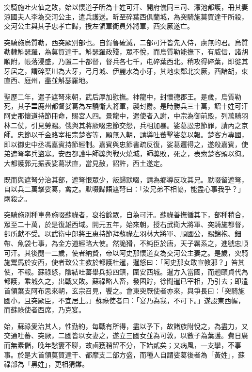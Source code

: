 \begin{pinyinscope}
 突騎施吐火仙之敗，始以懷道子昕為十姓可汗、開府儀同三司、濛池都護，冊其妻涼國夫人李為交河公主，遣兵護送。昕至碎葉西俱蘭城，為突騎施莫賀達干所殺，交河公主與其子忠孝亡歸，授左領軍衛員外將軍，西突厥遂亡。



 突騎施烏質勒，西突厥別部也。自賀魯破滅，二部可汗皆先入侍，虜無的君。烏質勒隸斛瑟羅，為莫賀達干。斛瑟羅政殘，眾不悅，而烏質勒能撫下，有威信，諸胡順附，帳落浸盛，乃置二十都督，督兵各七千，屯碎葉西北。稍攻得碎葉，即徙其牙居之，謂碎葉川為大牙，弓月城、伊麗水為小牙，其地東鄰北突厥，西諸胡，東直西、庭州，盡並斛瑟羅地。



 聖歷二年，遣子遮弩來朝，武后厚加慰撫。神龍中，封懷德郡王。是歲，烏質勒死，其子〓鹿州都督娑葛為左驍衛大將軍，襲封爵。是時勝兵三十萬，詔十姓可汗阿史那懷道持節冊命，賜宮人四。景龍中，遣使者入謝，中宗為御前殿，列萬騎羽林二仗，引見勞賜。俄與其將厥啜忠節交怨，兵相加暴。娑葛訟忠節罪，請內之京師。忠節以千金賂宰相宗楚客等，願無入朝，請導吐蕃擊娑葛以報。楚客方專國，即以御史中丞馮嘉賓持節經制。嘉賓與忠節書疏反復，娑葛邏得之，遂殺嘉賓，使弟遮弩率兵盜塞。安西都護牛師獎與戰火燒城，師獎敗，死之，表索楚客頭以徇。大都護郭元振表娑葛狀直，當見赦，詔許，西土遂定。



 既而與遮弩分治其部，遮弩恨眾少，叛歸默啜，請為鄉導反攻其兄。默啜留遮弩，自以兵二萬擊娑葛，禽之。默啜歸語遮弩曰：「汝兄弟不相協，能盡心事我乎？」兩殺之。



 突騎施別種車鼻施啜蘇祿者，裒拾餘眾，自為可汗。蘇祿善撫循其下，部種稍合，眾至二十萬，於是復雄西域。開元五年，始來朝，授右武衛大將軍、突騎施都督，卻所獻不受。以武衛中郎將王惠持節拜蘇祿左羽林大將軍、順國公，賜錦袍、鈿帶、魚袋七事，為金方道經略大使。然詭猾，不純臣於唐，天子羈系之，進號忠順可汗。其後閱一二歲，使者納贄，帝以阿史那懷道女為交河公主妻之。是歲，突騎施鬻馬於安西，使者致公主教於都護杜暹，暹怒曰：「阿史那女敢宣教邪？」笞其使，不報。蘇祿怒，陰結吐蕃舉兵掠四鎮，圍安西城。暹方入當國，而趙頤貞代為都護，乘城久之，出戰又敗。蘇祿略人畜，發囷貯，徐聞暹已宰相，乃引去；即遣首領葉支阿布思來朝，玄宗召見，饗之。會東突厥使者亦來，與爭長曰：「突騎施國小，且突厥臣，不宜居上。」蘇祿使者曰：「宴乃為我，不可下。」遂設東西幄，而蘇祿使者西席，乃克宴。



 始，蘇祿愛治其人，性勤約，每戰有所得，盡以予下，故諸族附悅之，為盡力，又交通吐蕃、突厥，二國皆以女妻之，遂立三國女並為可敦，以數子為葉護。費日廣而無素儲，晚年愁窶不聊，故鹵獲稍留不分，下始貳矣；又病風，一支攣，不事事。於是大首領莫賀達干、都摩支二部方盛，而種人自謂娑葛後者為「黃姓」，蘇祿部為「黑姓」，更相猜讎。




\end{pinyinscope}

